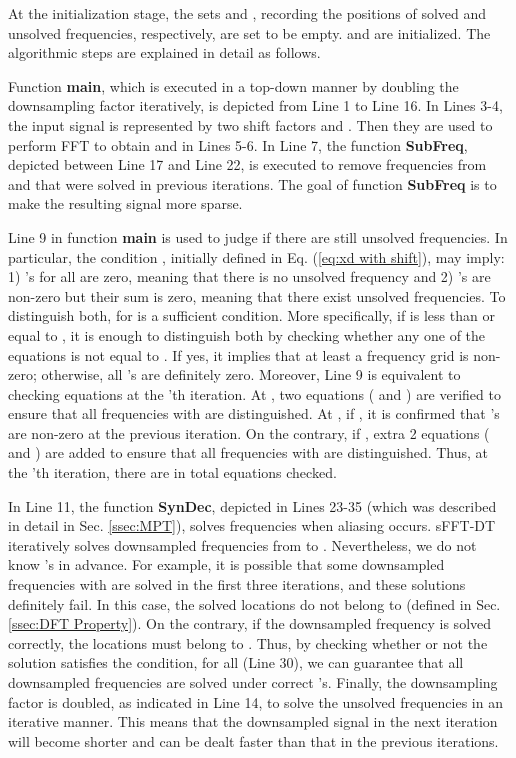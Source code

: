 \documentclass[journal,onecolumn,11pt]{IEEEtran}
\begin{document}
At the initialization stage, the sets  and , recording the positions of solved and unsolved frequencies, respectively, are set to be empty.
 and  are initialized.
The algorithmic steps are explained in detail as follows.

Function \textbf{main}, which is executed in a top-down manner by doubling the downsampling factor iteratively, is depicted from Line 1 to Line 16.
In Lines 3-4, the input signal  is represented by two shift factors  and .
Then they are used to perform FFT to obtain  and  in Lines 5-6.
In Line 7, the function \textbf{SubFreq}, depicted between Line 17 and Line 22, is executed to remove frequencies from  and  that were solved in previous iterations.
The goal of function \textbf{SubFreq} is to make the resulting signal more sparse.

Line 9 in function \textbf{main} is used to judge if there are still unsolved frequencies.
In particular, the condition , initially defined in Eq. (\ref{eq:xd with shift}), may imply:
1) 's for all  are zero, meaning that there is no unsolved frequency and
2) 's are non-zero but their sum is zero, meaning that there exist unsolved frequencies.
To distinguish both,  for  is a sufficient condition.
More specifically, if  is less than or equal to , it is enough to distinguish both by checking whether any one of the  equations is not equal to .
If yes, it implies that at least a frequency grid is non-zero; otherwise, all 's are definitely zero.
Moreover, Line 9 is equivalent to checking  equations at the 'th iteration.
At , two equations ( and ) are verified to ensure that all frequencies with  are distinguished.
At , if , it is confirmed that 's are non-zero at the previous iteration.
On the contrary, if , extra 2 equations ( and ) are added to ensure that all frequencies with  are distinguished.
Thus, at the 'th iteration, there are in total  equations checked.

In Line 11, the function \textbf{SynDec}, depicted in Lines 23-35 (which was described in detail in Sec. \ref{ssec:MPT}), solves frequencies when aliasing occurs. sFFT-DT iteratively solves downsampled frequencies from  to .
Nevertheless, we do not know 's in advance. For example, it is possible that some downsampled frequencies with  are solved in the first three iterations, and these solutions definitely fail.
In this case, the solved locations do not belong to  (defined in Sec. \ref{ssec:DFT Property}). On the contrary, if the downsampled frequency is solved correctly, the locations must belong to .
Thus, by checking whether or not the solution satisfies the condition,  for all  (Line 30), we can guarantee that all downsampled frequencies are solved under correct 's.
Finally, the downsampling factor is doubled, as indicated in Line 14, to solve the unsolved frequencies in an iterative manner.
This means that the downsampled signal in the next iteration will become shorter and can be dealt faster than that in the previous iterations.
\end{document}
